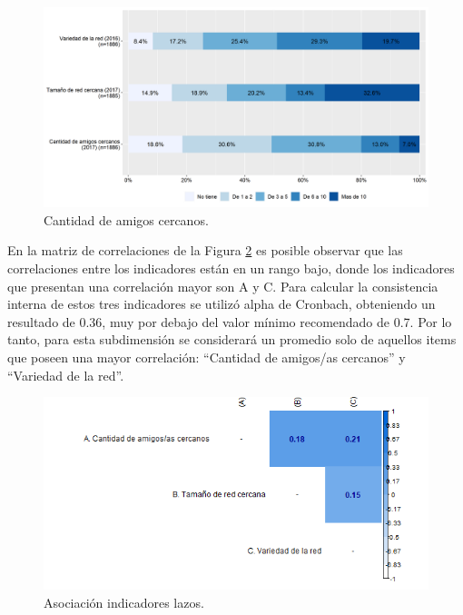 \documentclass[
  12pt,
]{book}
\begin{document}
\begin{figure}[H]

{\centering \includegraphics[width=1\linewidth,height=1\textheight]{output/graphs/lazos} 

}

\caption{Cantidad de amigos cercanos.}\label{fig:lazos}
\end{figure}

En la matriz de correlaciones de la Figura \ref{fig:lazos-cor} es posible observar que las correlaciones entre los indicadores están en un rango bajo, donde los indicadores que presentan una correlación mayor son A y C. Para calcular la consistencia interna de estos tres indicadores se utilizó alpha de Cronbach, obteniendo un resultado de 0.36, muy por debajo del valor mínimo recomendado de 0.7. Por lo tanto, para esta subdimensión se considerará un promedio solo de aquellos items que poseen una mayor correlación: ``Cantidad de amigos/as cercanos'' y ``Variedad de la red''.

\begin{figure}[H]

{\centering \includegraphics[width=1\linewidth,height=1\textheight]{output/graphs/lazos_cor} 

}

\caption{Asociación indicadores lazos.}\label{fig:lazos-cor}
\end{figure}
\end{document}
